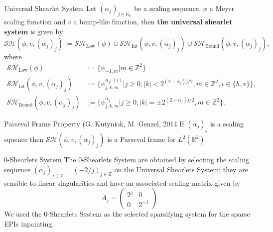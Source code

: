 \begin{frame}
\begin{block}{Universal Shearlet System}
Let $(\alpha_j)_{j\in \mathbb{N}_0}$ be a scaling sequence, $\phi$ a Meyer scaling function and $v$ a bump-like function, then \textbf{the universal shearlet system} is given by
$$
\mathcal{SH}(\phi,v,(\alpha_j)_j):=\mathcal{SH}_{\text{Low}}(\phi)\cup\mathcal{SH}_{\text{Int}}(\phi,v,(\alpha_j)_j)\cup\mathcal{SH}_{\text{Bound}}(\phi,v,(\alpha_j)_j),
$$
where
$$
\begin{aligned}
\mathcal{SH}_{\text{Low}}(\phi)&:=\{\psi_{-1,m}|m\in\mathbb{Z}^2\}\\
\mathcal{SH}_{\text{Int}}(\phi,v,(\alpha_j)_j)&:=\{\psi_{j,k,m}^{\alpha_j,(\iota)}|j\geq 0,|k|< 2^{(2-\alpha_j)j/2},m\in\mathbb{Z}^2,\iota\in\{h,v\}\},\\
\mathcal{SH}_{\text{Bound}}(\phi,v,(\alpha_j)_j)&:=\{\psi_{j,k,m}^{\alpha_j}|j\geq 0,|k|=\pm 2^{(2-\alpha_j)j/2},m\in\mathbb{Z}^2\}.
\end{aligned}
$$
\end{block}

\begin{block}{Parseval Frame Property (G. Kutyniok, M. Genzel, 2014}
If $(\alpha_j)_j$ is a scaling squence then $\mathcal{SH}(\phi,v,(\alpha_j)_j)$ is a Parseval frame for $L^2(\mathbb{R}^2)$.
\end{block}
\end{frame}

\begin{frame}
\begin{block}{$0$-Shearlets System}
The $0$-Shearlets System are obtained by selecting the scaling sequence $(\alpha_j)_{j\in\mathbb{Z}}=(-2/j)_{j\in\mathbb{Z}}$ on the Universal Shearlets System; they are sensible to linear singularities and have an associated scaling matrix given by
$$
A_j =\left(\begin{matrix} 2^j & 0 \\ 0 & 2^{-1} \end{matrix}\right)
$$
We used the $0$-Shearlets System as the selected sparsifying system for the sparse EPIs inpainting.
\end{block}
\end{frame}

